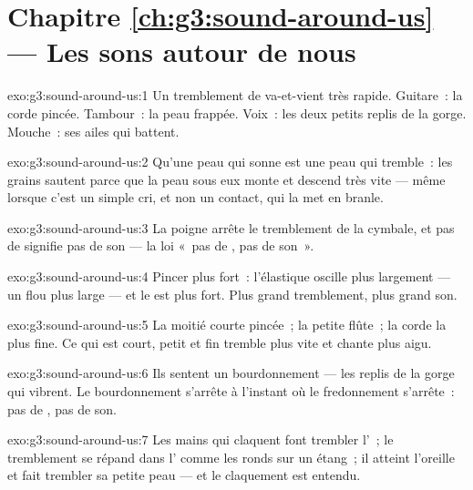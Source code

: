 \section*{Chapitre \ref{ch:g3:sound-around-us} --- Les sons autour de nous}

\begin{solution}{exo:g3:sound-around-us:1}
Un tremblement de va-et-vient très rapide. Guitare~: la corde pincée.
Tambour~: la peau frappée. Voix~: les deux petits replis de la gorge.
Mouche~: ses ailes qui battent.
\end{solution}

\begin{solution}{exo:g3:sound-around-us:2}
Qu'une peau qui sonne est une peau qui tremble~: les grains sautent
parce que la peau sous eux monte et descend très vite --- même
lorsque c'est un simple cri, et non un contact, qui la met en branle.
\end{solution}

\begin{solution}{exo:g3:sound-around-us:3}
La poigne arrête le tremblement de la cymbale, et pas de 
signifie pas de son --- la loi «~pas de , pas de son~».
\end{solution}

\begin{solution}{exo:g3:sound-around-us:4}
Pincer plus fort~: l'élastique oscille plus largement --- un flou
plus large --- et le  est plus fort. Plus grand tremblement, plus
grand son.
\end{solution}

\begin{solution}{exo:g3:sound-around-us:5}
La moitié courte pincée~; la petite flûte~; la corde la plus fine. Ce
qui est court, petit et fin tremble plus vite et chante plus aigu.
\end{solution}

\begin{solution}{exo:g3:sound-around-us:6}
Ils sentent un bourdonnement --- les replis de la gorge qui vibrent.
Le bourdonnement s'arrête à l'instant où le fredonnement s'arrête~:
pas de , pas de son.
\end{solution}

\begin{solution}{exo:g3:sound-around-us:7}
Les mains qui claquent font trembler l'~; le tremblement se répand
dans l' comme les ronds sur un étang~; il atteint l'oreille et
fait trembler sa petite peau --- et le claquement est entendu.
\end{solution}

